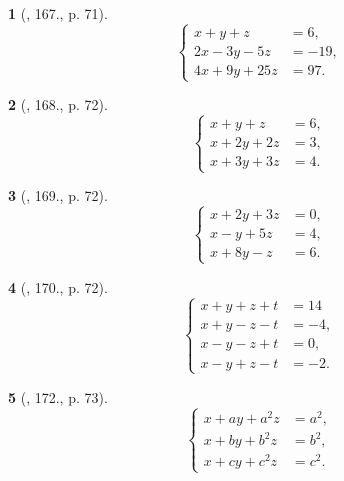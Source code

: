 \documentclass{article}
\newtheorem{baitoan}{}
\begin{document}
\begin{baitoan}[\cite{Dong_23_1001_toan_I}, 167., p. 71]
	\begin{equation*}
		\left\{\begin{split}
			x + y + z &= 6,\\
			2x - 3y - 5z &= -19,\\
			4x + 9y + 25z &= 97.
		\end{split}\right.
	\end{equation*}
\end{baitoan}

\begin{baitoan}[\cite{Dong_23_1001_toan_I}, 168., p. 72]
	\begin{equation*}
		\left\{\begin{split}
			x + y + z &= 6,\\
			x + 2y + 2z &= 3,\\
			x + 3y + 3z &= 4.
		\end{split}\right.
	\end{equation*}
\end{baitoan}

\begin{baitoan}[\cite{Dong_23_1001_toan_I}, 169., p. 72]
	\begin{equation*}
		\left\{\begin{split}
			x + 2y + 3z &= 0,\\
			x - y + 5z &= 4,\\
			x + 8y - z &= 6.
		\end{split}\right.
	\end{equation*}
\end{baitoan}

\begin{baitoan}[\cite{Dong_23_1001_toan_I}, 170., p. 72]
	\begin{equation*}
		\left\{\begin{split}
			x + y + z + t &= 14\\
			x + y - z - t &= -4,\\
			x - y - z + t &= 0,\\
			x - y + z - t &= -2.
		\end{split}\right.
	\end{equation*}
\end{baitoan}

\begin{baitoan}[\cite{Dong_23_1001_toan_I}, 172., p. 73]
	\begin{equation*}
		\left\{\begin{split}
			x + ay + a^2z &= a^2,\\
			x + by + b^2z &= b^2,\\
			x + cy + c^2z &= c^2.
		\end{split}\right.
	\end{equation*}
\end{baitoan}
\end{document}
